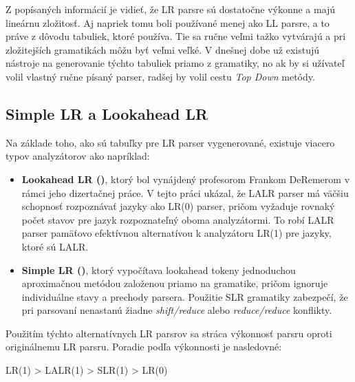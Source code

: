 Z popísaných informácií je vidieť, že LR parsre sú dostatočne výkonne a majú lineárnu zložitosť. Aj napriek tomu boli používané menej ako LL parsre, a to práve z dôvodu tabuliek, ktoré používa. Tie sa ručne veľmi tažko vytvárajú a pri zložitejších gramatikách môžu byť veľmi veľké. V dnešnej dobe už existujú nástroje na generovanie týchto tabuliek priamo z gramatiky, no ak by si užívateľ volil vlastný ručne písaný parser, radšej by volil cestu \textit{Top Down} metódy.



\subsection{Simple LR a Lookahead LR}
Na základe toho, ako sú tabuľky pre LR parser vygenerované, existuje viacero typov analyzátorov ako napríklad:

\begin{itemize}
\item \textbf{Lookahead LR (\textbf{})}, ktorý bol vynájdený profesorom  Frankom DeRemerom v rámci jeho dizertačnej práce\cite{deremer1969practical}. V tejto práci ukázal, že LALR parser má väčšiu schopnosť rozpoznávať jazyky ako LR(0) parser, pričom vyžaduje rovnaký počet stavov pre jazyk rozpoznateľný oboma analyzátormi. To robí LALR parser pamäťovo efektívnou alternatívou k analyzátoru LR(1) pre jazyky, ktoré sú LALR.

\item \textbf{Simple LR ()}, ktorý vypočítava lookahead tokeny jednoduchou aproximačnou metódou založenou priamo na gramatike, pričom ignoruje individuálne stavy a prechody parsera. Použitie SLR gramatiky zabezpečí, že pri parsovaní nenastanú žiadne \textit{shift/reduce} alebo \textit{reduce/reduce} konflikty\cite{deremer1971simple}.
\end{itemize}

Použitím týchto alternatívnych LR parsrov sa stráca výkonnosť parsru oproti originálnemu LR parsru. Poradie podľa výkonnosti je nasledovné:
\begin{center}
 LR(1) > LALR(1) > SLR(1) > LR(0) \cite{grune2007parsing}
\end{center}

